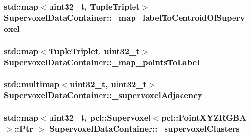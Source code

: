\hypertarget{classSupervoxelDataContainer_a0021bdaa8ddf908922afa29911a0f5eb}{
\subsubsection[{\-\_\-map\-\_\-label\-To\-Centroid\-Of\-Supervoxel}]{\setlength{\rightskip}{0pt plus 5cm}std\-::map$<$uint32\-\_\-t, {\bf Tuple\-Triplet}$>$ Supervoxel\-Data\-Container\-::\-\_\-map\-\_\-label\-To\-Centroid\-Of\-Supervoxel}}\label{classSupervoxelDataContainer_a0021bdaa8ddf908922afa29911a0f5eb}
\hypertarget{classSupervoxelDataContainer_a4fd7af5a22476fc212394a9fdd869f98}{
\subsubsection[{\-\_\-map\-\_\-points\-To\-Label}]{\setlength{\rightskip}{0pt plus 5cm}std\-::map$<${\bf Tuple\-Triplet}, uint32\-\_\-t$>$ Supervoxel\-Data\-Container\-::\-\_\-map\-\_\-points\-To\-Label}}\label{classSupervoxelDataContainer_a4fd7af5a22476fc212394a9fdd869f98}
\hypertarget{classSupervoxelDataContainer_a5730592d6b01b4770f65ab274901505f}{
\subsubsection[{\-\_\-supervoxel\-Adjacency}]{\setlength{\rightskip}{0pt plus 5cm}std\-::multimap$<$uint32\-\_\-t, uint32\-\_\-t$>$ Supervoxel\-Data\-Container\-::\-\_\-supervoxel\-Adjacency}}\label{classSupervoxelDataContainer_a5730592d6b01b4770f65ab274901505f}
\hypertarget{classSupervoxelDataContainer_a93773d70194fdb465f29cd4aa5aacb6d}{
\subsubsection[{\-\_\-supervoxel\-Clusters}]{\setlength{\rightskip}{0pt plus 5cm}std\-::map$<$uint32\-\_\-t, pcl\-::\-Supervoxel$<$pcl\-::\-Point\-X\-Y\-Z\-R\-G\-B\-A$>$\-::Ptr $>$ Supervoxel\-Data\-Container\-::\-\_\-supervoxel\-Clusters}}\label{classSupervoxelDataContainer_a93773d70194fdb465f29cd4aa5aacb6d}
